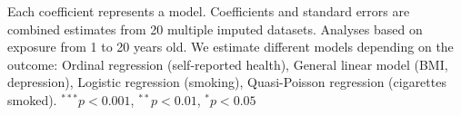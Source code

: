 \begin{table}[htp]
\begin{center}
\begin{threeparttable}
\begin{tabular}{l D{.}{.}{4.3} D{.}{.}{4.3} D{.}{.}{4.3} D{.}{.}{4.4} D{.}{.}{4.5} }
\end{tabular}
\begin{tablenotes}
\scriptsize
\item Each coefficient represents a model. Coefficients and standard errors are combined estimates from 20 multiple imputed datasets. Analyses based on exposure from 1 to 20 years old. We estimate different models depending on the outcome: Ordinal regression (self-reported health), General linear model (BMI, depression), Logistic regression (smoking), Quasi-Poisson regression (cigarettes smoked). $^{***}p<0.001$, $^{**}p<0.01$, $^*p<0.05$
\end{tablenotes}
\label{tab:psid_q_models}
\end{threeparttable}
\end{center}
\end{table}
